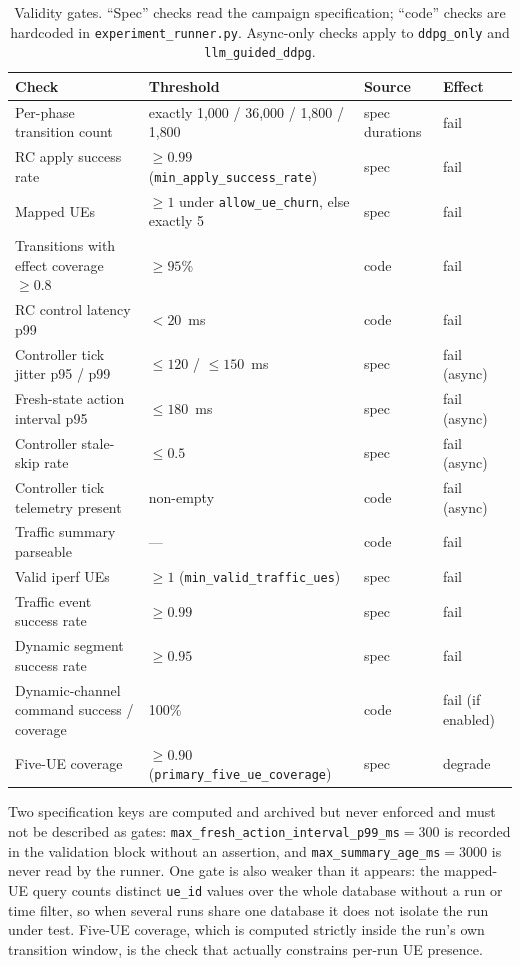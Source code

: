 \begin{table}[t]
\centering
\footnotesize
\caption{Validity gates. ``Spec'' checks read the campaign specification; ``code'' checks are
hardcoded in \texttt{experiment\_runner.py}. Async-only checks apply to \texttt{ddpg\_only}
and \texttt{llm\_guided\_ddpg}.}
\label{tab:proto-gates}
\begin{tabular}{llll}
\toprule
Check & Threshold & Source & Effect\\
\midrule
Per-phase transition count & exactly 1{,}000 / 36{,}000 / 1{,}800 / 1{,}800 & spec durations & fail\\
RC apply success rate & $\geq0.99$ (\texttt{min\_apply\_success\_rate}) & spec & fail\\
Mapped UEs & $\geq1$ under \texttt{allow\_ue\_churn}, else exactly 5 & spec & fail\\
Transitions with effect coverage $\geq0.8$ & $\geq95\%$ & code & fail\\
RC control latency p99 & $<20$~ms & code & fail\\
Controller tick jitter p95 / p99 & $\leq120$ / $\leq150$~ms & spec & fail (async)\\
Fresh-state action interval p95 & $\leq180$~ms & spec & fail (async)\\
Controller stale-skip rate & $\leq0.5$ & spec & fail (async)\\
Controller tick telemetry present & non-empty & code & fail (async)\\
Traffic summary parseable & --- & code & fail\\
Valid iperf UEs & $\geq1$ (\texttt{min\_valid\_traffic\_ues}) & spec & fail\\
Traffic event success rate & $\geq0.99$ & spec & fail\\
Dynamic segment success rate & $\geq0.95$ & spec & fail\\
Dynamic-channel command success / coverage & 100\% & code & fail (if enabled)\\
Five-UE coverage & $\geq0.90$ (\texttt{primary\_five\_ue\_coverage}) & spec & degrade\\
\bottomrule
\end{tabular}
\end{table}

Two specification keys are computed and archived but never enforced and must not be described
as gates: \texttt{max\_fresh\_action\_interval\_p99\_ms}${}=300$ is recorded in the validation
block without an assertion, and \texttt{max\_summary\_age\_ms}${}=3000$ is never read by the
runner. One gate is also weaker than it appears: the mapped-UE query counts distinct
\texttt{ue\_id} values over the whole database without a run or time filter, so when several
runs share one database it does not isolate the run under test. Five-UE coverage, which is
computed strictly inside the run's own transition window, is the check that actually
constrains per-run UE presence.

